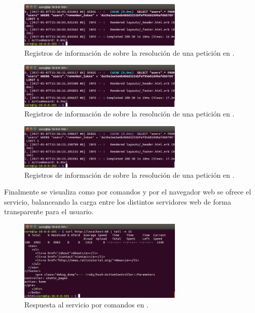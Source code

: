 
\begin{figure}[H]
\centering
\includegraphics[width=0.7\textwidth]{images/figures/logs3-confd.png}
\caption{Registros de información de  sobre la resolución de una petición en .}
\end{figure}

\begin{figure}[H]
\centering
\includegraphics[width=0.7\textwidth]{images/figures/logs1-confd.png}
\caption{Registros de información de  sobre la resolución de una petición en .}
\end{figure}

\begin{figure}[H]
\centering
\includegraphics[width=0.7\textwidth]{images/figures/logs2-confd.png}
\caption{Registros de información de  sobre la resolución de una petición en .}
\end{figure}

Finalmente se visualiza como por comandos y por el navegador web se ofrece el servicio, balanceando la carga entre los distintos servidores web de forma transparente para el usuario.

\begin{figure}[H]
\centering
\includegraphics[width=0.7\textwidth]{images/figures/curl-confd.png}
\caption{Respuesta al servicio por comandos en .}
\end{figure}

